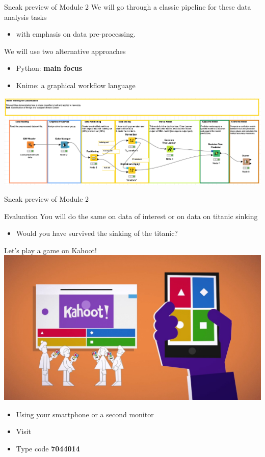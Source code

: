 \documentclass{beamer}%
\begin{document}
\begin{frame}{Sneak preview of Module 2}
	We will go through a classic pipeline for these data analysis tasks
\begin{itemize}
	\item with emphasis on data pre-processing.
	\end{itemize}		
We will use two alternative approaches 
	\begin{itemize}
		\item Python: \textbf{main focus}
		\item Knime: a graphical workflow language
	\end{itemize}		
\centering
	\includegraphics[width=1.0\linewidth]{figures/knimepipeline.png}
\end{frame}

\begin{frame}{Sneak preview of Module 2}
	\begin{block}{Evaluation}
		You will do the same on data of interest or on data on titanic sinking
	\begin{itemize}
		\item Would you have survived the sinking of the titanic?
	\end{itemize}				
	\end{block}
\end{frame}

\begin{frame}{Let's play a game on Kahoot!}
	\centering
\includegraphics[width=0.8\linewidth]{figures/kahoot.jpg}
	\begin{itemize}	
	\item Using your smartphone or a second monitor
	\item Visit	
	\item Type code {\color{blue}\textbf{7044014}}
	\end{itemize}
\end{frame}
\end{document}
